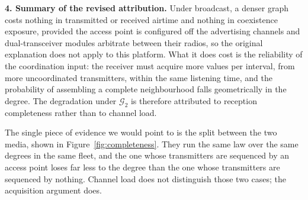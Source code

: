 \begin{enumerate}
\textbf{4. Summary of the revised attribution.} Under broadcast, a denser graph
costs nothing in transmitted or received airtime and nothing in coexistence
exposure, provided the access point is configured off the advertising channels
and dual-transceiver modules arbitrate between their radios, so the original
explanation does not apply to this platform. What it does cost is the
reliability of the coordination input: the receiver must acquire more values per
interval, from more uncoordinated transmitters, within the same listening time,
and the probability of assembling a complete neighbourhood falls geometrically
in the degree. The degradation under $\mathcal{G}_2$ is therefore attributed to
reception completeness rather than to channel load.

The single piece of evidence we would point to is the split between the two
media, shown in Figure~\ref{fig:completeness}. They run the same law over the
same degrees in the same fleet, and the one whose transmitters are sequenced by
an access point loses far less to the degree than the one whose transmitters are
sequenced by nothing. Channel load does not distinguish those two cases; the
acquisition argument does.

\end{enumerate}
